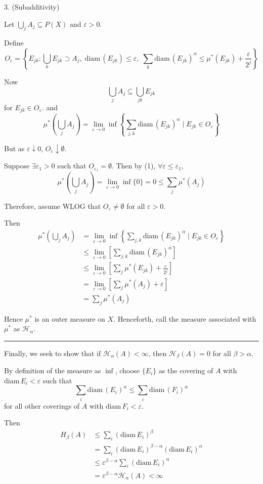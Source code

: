 \documentclass[12pt]{article}
\newcommand{\ep}{\varepsilon}
\renewcommand{\H}{\mathcal{H}}
\newcommand{\diam}{\text{diam}\,}
\newcommand{\sub}{\subseteq}
\renewcommand{\div}{\vspace*{10pt}\hrule\vspace*{10pt}}
\begin{document}
    3. (Subadditivity)

    Let $\bigcup_{j} A_j \sub P(X)$ and $\ep > 0$. 

    Define 
    \[O_{\ep} = \left\{E_{jk}: \bigcup_{k} E_{jk} \supset A_j,\; \diam(E_{jk}) \leq \ep, \; \sum_k \diam(E_{jk})^{\alpha} \leq \mu^*(E_{jk}) + \frac{\ep}{2^j}\right\}\]

    Now
    \[\bigcup_{j} A_j \sub \bigcup_{jk} E_{jk}\]
    for $E_{jk} \in O_{\ep}$. 
    and 
    \[\mu^*\left(\bigcup_j A_j\right) = \lim_{\ep \to 0} \inf\left\{\sum_{j,k} \diam(E_{jk})^{\alpha} \; \bigg\vert\; E_{jk} \in O_{\ep}\right\}\]

    But as $\ep \downarrow 0$, $O_{\ep} \downarrow \emptyset$. 

    Suppose $\exists \ep_1 > 0$ such that $O_{\ep_1} = \emptyset$. Then by (1), $\forall \ep \leq \ep_1$, 
    \[\mu^*(\bigcup_j A_j) = \lim_{\ep \to 0} \inf\{0\} = 0\leq \sum_j \mu^*(A_j) \] 

    Therefore, assume WLOG that $O_{\ep} \neq \emptyset$ for all $\ep > 0$. 

    Then
    \begin{align*}
        \mu^*\left(\bigcup_j A_j\right) &= \lim_{\ep \to 0} \inf\left\{\sum_{j,k} \diam(E_{jk})^{\alpha} \; \bigg\vert\; E_{jk} \in O_{\ep}\right\}\\ 
        &\leq \lim_{\ep \to 0}\left[\sum_{j,k} \diam(E_{jk})^{\alpha}\right]\\
        &\leq \lim_{\ep \to 0}\left[\sum_{j} \mu^*(E_{jk}) + \frac{\ep}{2^j}\right]\\
        &= \lim_{\ep \to 0}\left[\sum_{j} \mu^*(A_j) + \ep\right]\\
        &= \sum_{j} \mu^*(A_j)
    \end{align*}

    Hence $\mu^*$ is an outer measure on $X$. Henceforth, call the measure associated with $\mu^*$ as $\H_{\alpha}$.
    
    \div

    Finally, we seek to show that if $\H_{\alpha}(A) < \infty$, then $\H_{\beta}(A) = 0$ for all $\beta > \alpha$. 

    By definition of the measure as $\inf$, choose $\{E_i\}$ as the covering of $A$ with $\diam E_i < \ep$ such that 
    \[\sum_i \diam(E_i)^{\alpha} \leq \sum_i \diam(F_i)^{\alpha}\]
    for all other coverings of $A$ with $\diam F_i < \ep$.

    Then 
    \begin{align*}
        H_{\beta}(A) &\leq \sum_{i} (\diam E_i)^\beta\\
            &= \sum_i (\diam E_i)^{\beta - \alpha} (\diam E_i)^{\alpha}\\ 
            &\leq \ep^{\beta - \alpha} \sum_i (\diam E_i)^\alpha\\
            &= \ep^{\beta - \alpha} \H_{\alpha}(A) < \infty
    \end{align*}
\end{document}
